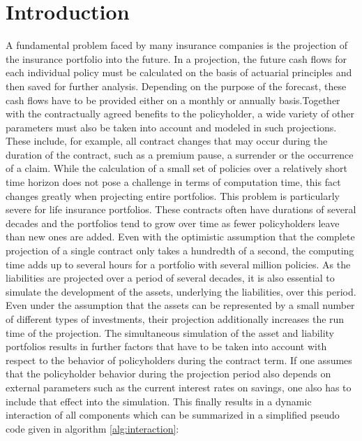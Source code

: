 

\chapter{Introduction}
\label{cha:introduction}

A fundamental problem faced by many insurance companies is the projection of the insurance portfolio into the future. In a projection, the future cash flows for each individual policy must be calculated on the basis of actuarial principles and then saved for further analysis. Depending on the purpose of the forecast, these cash flows have to be provided either on a monthly or annually basis.Together with the contractually agreed benefits to the policyholder, a wide variety of other parameters must also be taken into account and modeled in such projections. These include, for example, all contract changes that may occur during the duration of the contract, such as a premium pause, a surrender or the occurrence of a claim. While the calculation of a small set of policies over a relatively short time horizon does not pose a challenge in terms of computation time, this fact changes greatly when projecting entire portfolios. This problem is particularly severe for life insurance portfolios. These contracts often have durations of several decades and the portfolios tend to grow over time as fewer policyholders leave than new ones are added. Even with the optimistic assumption that the complete projection of a single contract only takes a hundredth of a second, the computing time adds up to several hours for a portfolio with several million policies. As the liabilities are projected over a period of several decades, it is also essential to simulate the development of the assets, underlying the liabilities, over this period. Even under the assumption that the assets can be represented by a small number of different types of investments, their projection additionally increases the run time of the projection. The simultaneous simulation of the asset and liability portfolios results in further factors that have to be taken into account with respect to the behavior of policyholders during the contract term. If one assumes that the policyholder behavior during the projection period also depends on external parameters such as the current interest rates on savings, one also has to include that effect into the simulation. This finally results in a dynamic interaction of all components which can be summarized in a simplified pseudo code given in algorithm \ref{alg:interaction}:


